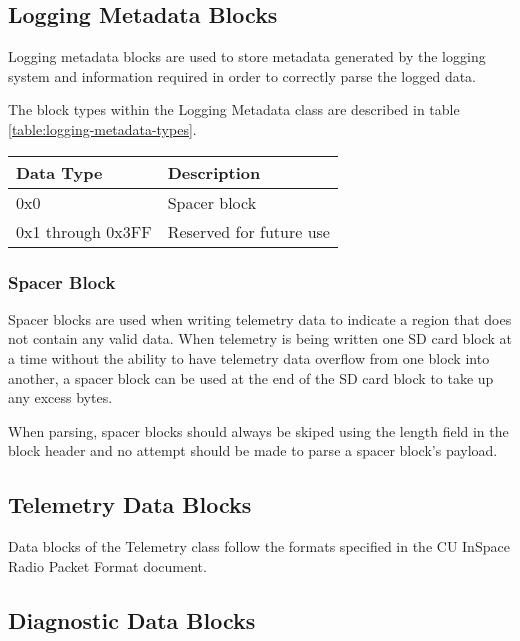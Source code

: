 \subsection{Logging Metadata Blocks}
\label{subsec:logging-metadata-blocks}

Logging metadata blocks are used to store metadata generated by the logging
system and information required in order to correctly parse the logged data.

The block types within the Logging Metadata class are described in table
\ref{table:logging-metadata-types}.

\begin{table*}[htb]
\centering
\begin{tabular}{@{}ll@{}}
\toprule
Data Type           &   Description \\
\midrule
0x0                 &   Spacer block \\
0x1 through 0x3FF   &   Reserved for future use \\
\bottomrule
\end{tabular}
\caption{Logging metadata block types}
\label{table:logging-metadata-types}
\end{table*}

\subsubsection{Spacer Block}

Spacer blocks are used when writing telemetry data to indicate a region that
does not contain any valid data. When telemetry is being written one SD card
block at a time without the ability to have telemetry data overflow from one
block into another, a spacer block can be used at the end of the SD card block
to take up any excess bytes.

When parsing, spacer blocks should always be skiped using the length field in
the block header and no attempt should be made to parse a spacer block's
payload.




\subsection{Telemetry Data Blocks}
\label{subsec:telemetry-data-blocks}

Data blocks of the Telemetry class follow the formats specified in the CU
InSpace Radio Packet Format document.

\subsection{Diagnostic Data Blocks}
\label{subsec:diagnostic-data-blocks}

